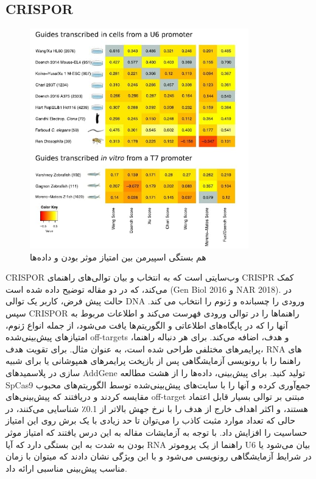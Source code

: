 \documentclass[12pt,a4paper,BCOR=.7cm,headsepline,bibliography=totoc]{report}
\begin{document}
\subsection{CRISPOR~\cite{CRISPOR}}
\begin{figure}
\centering
\includegraphics[width=9.5cm, ]{pictures/CRISPOR.jpg}
\caption{
هم بستگی اسپیرمن بین امتیاز موثر بودن و داده‌ها	
}\label{wrap-fig:4}
\end{figure}
CRISPOR
 وب‌سایتی است که به انتخاب و بیان توالی‌های راهنمای CRISPR کمک می‌کند، که در دو مقاله توضیح داده شده است (Gen Biol 2016 و NAR 2018). در حالت پیش فرض، کاربر یک توالی DNA ورودی را چسبانده و ژنوم را انتخاب می کند. سپس CRISPOR راهنماها را در توالی ورودی فهرست می‌کند و اطلاعات مربوط به آنها را که در پایگاه‌های اطلاعاتی و الگوریتم‌ها یافت می‌شود، از جمله انواع ژنوم، امتیازهای پیش‌بینی‌شده off-targets و هدف، اضافه می‌کند. برای هر دنباله راهنما، پرایمرهای مختلفی طراحی شده است، به عنوان مثال. برای تقویت هدف، RNA های راهنما را با رونویسی آزمایشگاهی پس از بازپخت پرایمرهای همپوشانی یا برای شبیه سازی در پلاسمیدهای AddGene تولید کنید.
برای پیش‌بینی، داده‌ها را از هشت مطالعه  SpCas9 جمع‌آوری کرده و آنها را با سایت‌های پیش‌بینی‌شده توسط الگوریتم‌های محبوب مقایسه کردند و دریافتند که پیش‌بینی‌های off-target مبتنی بر توالی بسیار قابل اعتماد هستند، و اکثر اهداف خارج از هدف را با نرخ جهش بالاتر از 0.1٪ شناسایی می‌کنند، در حالی که تعداد موارد مثبت کاذب را می‌توان تا حد زیادی با یک برش روی این امتیاز حساسیت را افزایش داد. با توجه به آزمایشات مقاله به این درس یافتند که امتیاز موثر بودن به شدت به این بستگی دارد که آیا RNA راهنما از یک پروموتر U6 بیان می‌شود یا در شرایط آزمایشگاهی رونویسی می‌شود و با این ویژگی نشان دادند که میتوان با زمان مناسب پیش‌بینی مناسبی ارائه داد.
\end{document}

